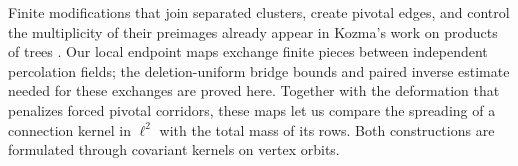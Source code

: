 Finite modifications that join separated clusters, create pivotal edges,
and control the multiplicity of their preimages already appear in Kozma's
work on products of trees \cite[Section~1.4 and Lemmas~7--11]{Kozma2011}.
Our local endpoint maps exchange finite pieces between independent
percolation fields; the deletion-uniform bridge bounds and paired inverse
estimate needed for these exchanges are proved here. Together with the
deformation that penalizes forced pivotal corridors, these maps let us
compare the spreading of a connection kernel in $\ell^2$ with the total
mass of its rows. Both constructions are formulated through covariant
kernels on vertex orbits.
